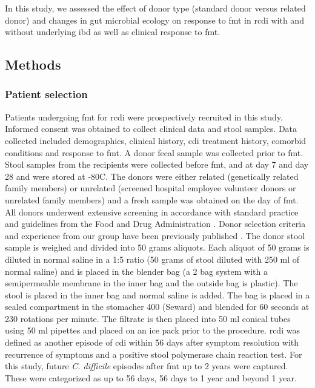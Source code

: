 In this study, we assessed the effect of donor type (standard donor versus related donor) and changes in gut microbial ecology on response to \gls{fmt} in \gls{rcdi} with and without underlying \gls{ibd} as well as clinical response to \gls{fmt}. 

\subsection{Methods}
\subsubsection{Patient selection}
Patients undergoing \gls{fmt} for \gls{rcdi} were prospectively recruited in this study. Informed consent was obtained to collect clinical data and stool samples. Data collected included demographics, clinical history, \gls{cdi} treatment history, comorbid conditions and response to \gls{fmt}. A donor fecal sample was collected prior to \gls{fmt}. Stool samples from the recipients were collected before \gls{fmt}, and at day 7 and day 28 and were stored at -80\textdegree C. The donors were either related (genetically related family members) or unrelated (screened hospital employee volunteer donors or unrelated family members) and a fresh sample was obtained on the day of \gls{fmt}. All donors underwent extensive screening in accordance with standard practice and guidelines from the Food and Drug Administration \cite{RN1446}. Donor selection criteria and experience from our group have been previously published \cite{RN1523}. The donor stool sample is weighed and divided into 50 grams aliquots. Each aliquot of 50 grams is diluted in normal saline in a 1:5 ratio (50 grams of stool diluted with 250 ml of normal saline) and is placed in the blender bag (a 2 bag system with a semipermeable membrane in the inner bag and the outside bag is plastic). The stool is placed in the inner bag and normal saline is added. The bag is placed in a sealed compartment in the stomacher 400 (Seward) and blended for 60 seconds at 230 rotations per minute. The filtrate is then placed into 50 ml conical tubes using 50 ml pipettes and placed on an ice pack prior to the procedure.  \Gls{rcdi} was defined as another episode of \gls{cdi} within 56 days after symptom resolution with recurrence of symptoms and a positive stool polymerase chain reaction test. For this study, future \textit{C. difficile} episodes after \gls{fmt} up to 2 years were captured. These were categorized as up to 56 days, 56 days to 1 year and beyond 1 year. 


